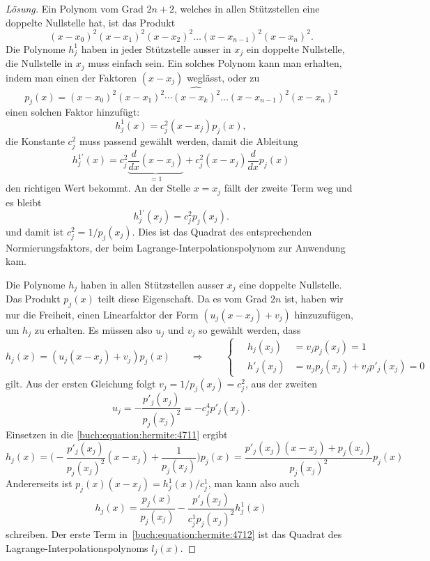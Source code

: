 \begin{proof}[Lösung]
Ein Polynom vom Grad $2n+2$, welches in allen Stützstellen eine 
doppelte Nullstelle hat, ist das Produkt
\[
(x-x_0)^2 (x-x_1)^2 (x-x_2)^2 \dots (x-x_{n-1})^2 (x-x_n)^2.
\]
Die Polynome $h^1_j$ haben in jeder Stützstelle ausser in $x_j$
ein doppelte Nullstelle, die Nullstelle in $x_j$ muss einfach sein.
Ein solches Polynom kann man erhalten, indem man einen der
Faktoren $(x-x_j)$ weglässt, oder zu
\[
p_j(x)
=
(x-x_0)^2 (x-x_1)^2 \cdots \widehat{(x-x_k)^2} \dots (x-x_{n-1})^2(x-x_n)^2
\]
einen solchen Faktor hinzufügt:
\[
h_j^1(x)
=
c_j^2 (x-x_j) p_j(x),
\]
die Konstante $c_j^2$ muss passend gewählt werden, damit die Ableitung
\[
h_j^{1\prime}(x)
=
c_j^2 \underbrace{\frac{d}{dx}(x-x_j)}_{\displaystyle=1}
+
c_j^2
(x-x_j)
\frac{d}{dx} p_j(x)
\]
den richtigen Wert bekommt.
An der Stelle $x=x_j$ fällt der zweite Term weg und es bleibt
\[
h_j^{1\prime}(x_j)
=
c_j^2 p_j(x_j).
\]
und damit ist $c_j^2 = 1/p_j(x_j)$.
Dies ist das Quadrat des entsprechenden Normierungsfaktors, der beim
Lagrange-Interpolationspolynom zur Anwendung kam.

Die Polynome $h_j$ haben in allen Stützstellen ausser $x_j$ eine doppelte
Nullstelle.
Das Produkt $p_j(x)$ teilt diese Eigenschaft.
Da es vom Grad $2n$ ist, haben wir nur die Freiheit, einen Linearfaktor
der Form $(u_j(x-x_j)+v_j)$ hinzuzufügen, um $h_j$ zu erhalten.
Es müssen also $u_j$ und $v_j$ so gewählt werden, dass
\begin{equation}
h_j(x)=(u_j(x-x_j)+v_j) p_j(x)
\qquad\Rightarrow\qquad
\left\{
\quad
\begin{aligned}
h_j(x_j) &= v_j p_j(x_j) = 1\\
h'_j(x_j) &= u_j p_j(x_j) + v_j p'_j(x_j)=0
\end{aligned}
\right.
\label{buch:equation:hermite:4711}
\end{equation}
gilt.
Aus der ersten Gleichung folgt $ v_j = 1/p_j(x_j) = c_j^2$, aus der zweiten
\[
u_j
=
-\frac{p'_j(x_j)}{p_j(x_j)^2}
=
- c_j^4 p'_j(x_j).
\]
Einsetzen in die \eqref{buch:equation:hermite:4711} ergibt
\[
h_j(x) = \biggl(-
\frac{p'_j(x_j)}{p_j(x_j)^2} (x-x_j) + \frac{1}{p_j(x_j)}\biggr) p_j(x)
=
\frac{p'_j(x_j)(x-x_j) + p_j(x_j)}{p_j(x_j)^2}p_j(x)
\]
Andererseits ist $p_j(x)(x-x_j)=h^1_j(x)/c_j^1$, man kann also auch
\begin{equation}
h_j(x)  
=
\frac{p_j(x)}{p_j(x_j)}
-
\frac{p'_j(x_j)}{c_j^1p_j(x_j)^2} h_j^1(x)
\label{buch:equation:hermite:4712}
\end{equation}
schreiben.
Der erste Term in~\eqref{buch:equation:hermite:4712} ist das Quadrat
des Lagrange-Interpolationspolynoms $l_j(x)$. 
\end{proof}

